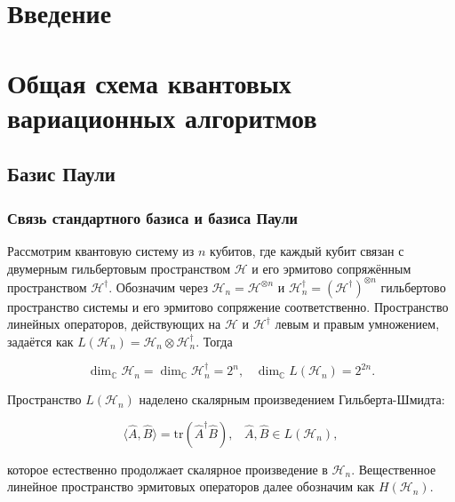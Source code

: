 \documentclass[a4paper]{report}
\begin{document}
\setcounter{page}{2}
\tableofcontents
\newpage

\chapter*{Введение}

\chapter{Общая схема квантовых вариационных алгоритмов}

\section{Базис Паули}
\subsection{Связь стандартного базиса и базиса \mbox{Паули}}

Рассмотрим квантовую систему из ${n}$ кубитов, где каждый кубит связан с двумерным гильбертовым пространством ${\mathcal{H}}$ и его эрмитово сопряжённым пространством ${\mathcal{H}^\dagger}$. Обозначим через ${\mathcal{H}_n = \mathcal{H}^{\otimes n}}$ и ${\mathcal{H}_n^\dagger = (\mathcal{H}^\dagger)^{\otimes n}}$ гильбертово пространство системы и его эрмитово сопряжение соответственно. Пространство линейных операторов, действующих на ${\mathcal{H}}$ и ${\mathcal{H}^\dagger}$ левым и правым умножением, задаётся как ${L(\mathcal{H}_n) = \mathcal{H}_n \otimes \mathcal{H}_n^\dagger}$. Тогда

$${\dim_\mathbb{C} \mathcal{H}_n = \dim_\mathbb{C} \mathcal{H}_n^\dagger = 2^n,\;\;\;
            \dim_\mathbb{C} L(\mathcal{H}_n) = 2^{2n}.}$$

Пространство ${L(\mathcal{H}_n)}$ наделено скалярным произведением Гильберта-Шмидта:

\begin{equation}\label{eq1}
    \langle\hat{A},\hat{B}\rangle = \mathrm{tr}(\hat{A}^\dagger\hat{B}),\;\;\;
    \hat{A},\hat{B} \in L(\mathcal{H}_n),
\end{equation}

\noindent которое естественно продолжает скалярное произведение в ${\mathcal{H}_n}$. Вещественное линейное пространство эрмитовых операторов далее обозначим как ${H(\mathcal{H}_n)}$.
\end{document}
